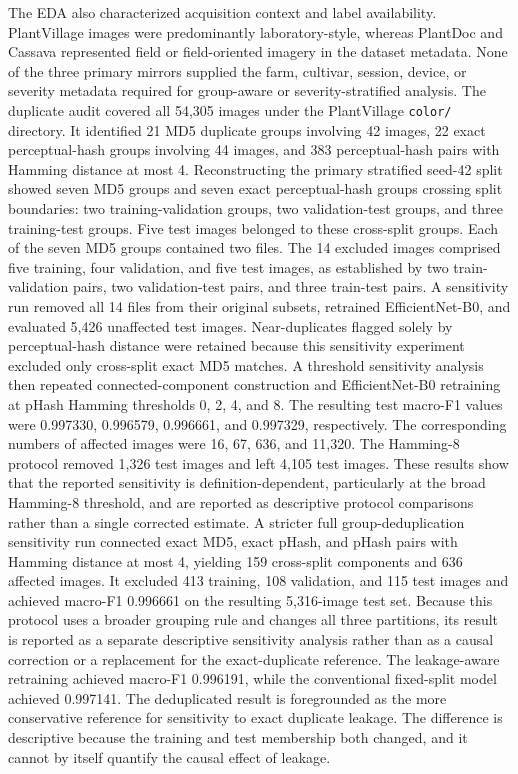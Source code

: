 \documentclass{sbc2023}%
\begin{document}
The EDA also characterized acquisition context and label availability. PlantVillage images were predominantly laboratory-style, whereas PlantDoc and Cassava represented field or field-oriented imagery in the dataset metadata. None of the three primary mirrors supplied the farm, cultivar, session, device, or severity metadata required for group-aware or severity-stratified analysis. The duplicate audit covered all 54,305 images under the PlantVillage \texttt{color/} directory. It identified 21 MD5 duplicate groups involving 42 images, 22 exact perceptual-hash groups involving 44 images, and 383 perceptual-hash pairs with Hamming distance at most 4. Reconstructing the primary stratified seed-42 split showed seven MD5 groups and seven exact perceptual-hash groups crossing split boundaries: two training-validation groups, two validation-test groups, and three training-test groups. Five test images belonged to these cross-split groups. Each of the seven MD5 groups contained two files. The 14 excluded images comprised five training, four validation, and five test images, as established by two train-validation pairs, two validation-test pairs, and three train-test pairs. A sensitivity run removed all 14 files from their original subsets, retrained EfficientNet-B0, and evaluated 5,426 unaffected test images. Near-duplicates flagged solely by perceptual-hash distance were retained because this sensitivity experiment excluded only cross-split exact MD5 matches. A threshold sensitivity analysis then repeated connected-component construction and EfficientNet-B0 retraining at pHash Hamming thresholds 0, 2, 4, and 8. The resulting test macro-F1 values were 0.997330, 0.996579, 0.996661, and 0.997329, respectively. The corresponding numbers of affected images were 16, 67, 636, and 11,320. The Hamming-8 protocol removed 1,326 test images and left 4,105 test images. These results show that the reported sensitivity is definition-dependent, particularly at the broad Hamming-8 threshold, and are reported as descriptive protocol comparisons rather than a single corrected estimate. A stricter full group-deduplication sensitivity run connected exact MD5, exact pHash, and pHash pairs with Hamming distance at most 4, yielding 159 cross-split components and 636 affected images. It excluded 413 training, 108 validation, and 115 test images and achieved macro-F1 0.996661 on the resulting 5,316-image test set. Because this protocol uses a broader grouping rule and changes all three partitions, its result is reported as a separate descriptive sensitivity analysis rather than as a causal correction or a replacement for the exact-duplicate reference. The leakage-aware retraining achieved macro-F1 0.996191, while the conventional fixed-split model achieved 0.997141. The deduplicated result is foregrounded as the more conservative reference for sensitivity to exact duplicate leakage. The difference is descriptive because the training and test membership both changed, and it cannot by itself quantify the causal effect of leakage.
\end{document}
